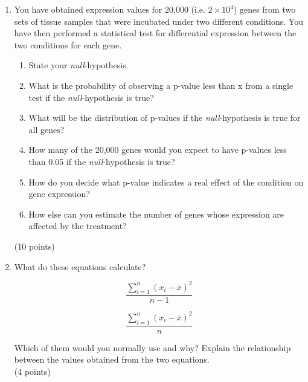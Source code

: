 \documentclass[11pt]{article}
\begin{document}
\begin{enumerate}
 
\item You have obtained expression values for 20,000 (i.e. $2 \times 10^4$) genes from two sets of tissue samples
  that were incubated under two different conditions. You have then performed
  a statistical test for differential expression between the two conditions
  for each gene.
  \begin{enumerate}
  \item State your \textit{null}-hypothesis.
  \item What is the probability of observing a p-value less than
    x from a single test if the \textit{null}-hypothesis is true?
  \item What will be the distribution of p-values if the
    \textit{null}-hypothesis is true for all genes?
  \item How many of the 20,000 genes would you expect to have p-values
    less than 0.05 if the \textit{null}-hypothesis is true?
  \item How do you decide what p-value indicates a real effect of
    the condition on gene expression?
  \item How else can you estimate the number of genes whose expression are
    affected by the treatment?
  \end{enumerate}
(10 points)

 

\item What do these equations calculate?

  \begin{minipage}{0.5\textwidth}
    $$ 
    \frac{\sum_{i=1}^{n}{(x_i - \overline{x})^2}}{n-1} 
    $$
  \end{minipage}%
  \begin{minipage}{0.5\textwidth}
    $$
    \frac{\sum_{i=1}^{n}{(x_i - \overline{x})^2}}{n} 
    $$
  \end{minipage}

  Which of them would you normally use and why? Explain the
  relationship between the values obtained from the two equations.\\
  (4 points)



  
  

\end{enumerate}
\end{document}
